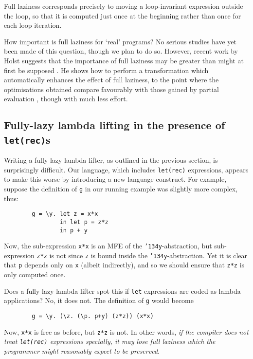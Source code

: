 Full laziness corresponds precisely to moving a loop-invariant
expression outside the loop, so that it is computed just once at the
beginning rather than once for each loop iteration.

How important is full laziness for `real' programs?
No serious studies have yet been made of this question, though we plan to
do so.
However, recent work by Holst
suggests that the importance of full laziness may be greater than
might at first be supposed \cite{Holst}.
He shows how to perform a transformation which automatically enhances the
effect of full laziness, to the point where the optimisations obtained
compare favourably with those gained by partial
evaluation \cite{Mix}, though with much less effort.

\subsection{Fully-lazy lambda lifting in the presence of \mbox{\tt let(rec)}s}

Writing a fully lazy lambda lifter, as outlined in the previous
section, is surprisingly difficult.  Our language, which includes
\mbox{\tt let(rec)} expressions, appears to make this worse by introducing a new
language construct.  For example, suppose the definition of \mbox{\tt g} in our
running example was slightly more complex, thus:
\begin{verbatim}
        g = \y. let z = x*x
                in let p = z*z
                in p + y
\end{verbatim}
Now, the sub-expression \mbox{\tt x*x} is an MFE of the
\mbox{\tt {\char'134}y}-abstraction, but sub-expression \mbox{\tt z*z} is not since \mbox{\tt z} is bound
inside the \mbox{\tt {\char'134}y}-abstraction.  Yet it is clear that \mbox{\tt p} depends only on
\mbox{\tt x} (albeit indirectly), and so we should ensure that \mbox{\tt z*z} is only
computed once.

Does a fully lazy lambda lifter spot this if \mbox{\tt let} expressions are coded
as lambda applications?  No, it does not.  The definition of \mbox{\tt g} would
become
\begin{verbatim}
        g = \y. (\z. (\p. p+y) (z*z)) (x*x)
\end{verbatim}
Now, \mbox{\tt x*x} is free as before, but \mbox{\tt z*z} is not.  In other words, {\em
if the compiler does not treat \mbox{\tt let(rec)} expressions specially, it may
lose full laziness which the programmer might reasonably expect to
be preserved}.

